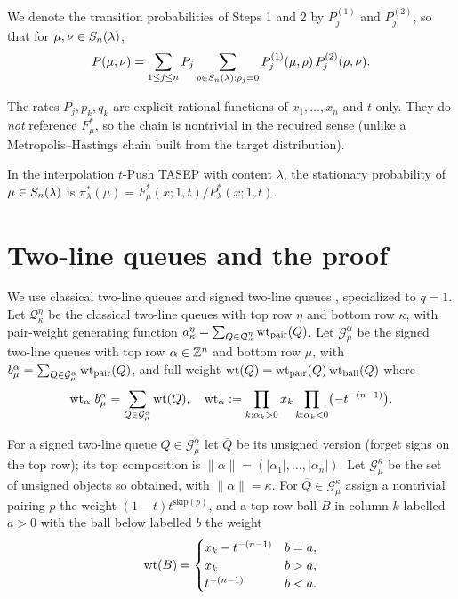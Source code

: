 \documentclass[11pt]{article}
\begin{document}
We denote the transition probabilities of Steps 1 and 2 by $P^{(1)}_j$ and
$P^{(2)}_j$, so that for $\mu,\nu\in S_n(\lambda)$,
\[
P(\mu,\nu)=\sum_{1\le j\le n}P_j\sum_{\rho\in S_n(\lambda):\rho_j=0}
P^{(1)}_j(\mu,\rho)\,P^{(2)}_j(\rho,\nu).
\]

\begin{qthreeremark}[nontriviality]
The rates $P_j,p_k,q_k$ are explicit rational functions of $x_1,\dots,x_n$ and
$t$ only. They do \emph{not} reference $F^*_\mu$, so the chain is nontrivial in
the required sense (unlike a Metropolis--Hastings chain built from the target
distribution).
\end{qthreeremark}

\begin{qthreetheorem}\label{thm:main}
In the interpolation $t$-Push TASEP with content $\lambda$, the stationary
probability of $\mu\in S_n(\lambda)$ is $\pi^*_\lambda(\mu)=F^*_\mu(x;1,t)/P^*_\lambda(x;1,t)$.
\end{qthreetheorem}

\section*{Two-line queues and the proof}

We use classical two-line queues \cite{CMW22} and signed two-line queues
\cite{BDW25a}, specialized to $q=1$. Let $\mathcal Q^\eta_\kappa$ be the classical
two-line queues with top row $\eta$ and bottom row $\kappa$, with pair-weight
generating function $a^\eta_\kappa=\sum_{Q\in\mathcal Q^\eta_\kappa}\operatorname{wt}_{\mathrm{pair}}(Q)$.
Let $\mathcal G^\alpha_\mu$ be the signed two-line queues with top row $\alpha\in\mathbb{Z}^n$
and bottom row $\mu$, with $b^\alpha_\mu=\sum_{Q\in\mathcal G^\alpha_\mu}\operatorname{wt}_{\mathrm{pair}}(Q)$,
and full weight $\operatorname{wt}(Q)=\operatorname{wt}_{\mathrm{pair}}(Q)\operatorname{wt}_{\mathrm{ball}}(Q)$ where
\begin{equation}\label{eq:wta}
\operatorname{wt}_\alpha\,b^\alpha_\mu=\sum_{Q\in\mathcal G^\alpha_\mu}\operatorname{wt}(Q),
\quad \operatorname{wt}_\alpha:=\prod_{k:\alpha_k>0}x_k\prod_{k:\alpha_k<0}\bigl(-t^{-(n-1)}\bigr).
\end{equation}

\begin{qthreedefinition}\label{def:unsigned}
For a signed two-line queue $Q\in\mathcal G^\alpha_\mu$ let $\overline Q$ be its
unsigned version (forget signs on the top row); its top composition is
$\|\alpha\|=(|\alpha_1|,\dots,|\alpha_n|)$. Let $\mathcal G^\kappa_\mu$ be the set of
unsigned objects so obtained, with $\|\alpha\|=\kappa$. For $\overline Q\in\mathcal G^\kappa_\mu$
assign a nontrivial pairing $p$ the weight $(1-t)t^{\mathrm{skip}(p)}$, and a top-row
ball $B$ in column $k$ labelled $a>0$ with the ball below labelled $b$ the weight
\[
\operatorname{wt}(B)=\begin{cases}x_k-t^{-(n-1)} & b=a,\\ x_k & b>a,\\ t^{-(n-1)} & b<a.\end{cases}
\]
\end{qthreedefinition}
\end{document}
